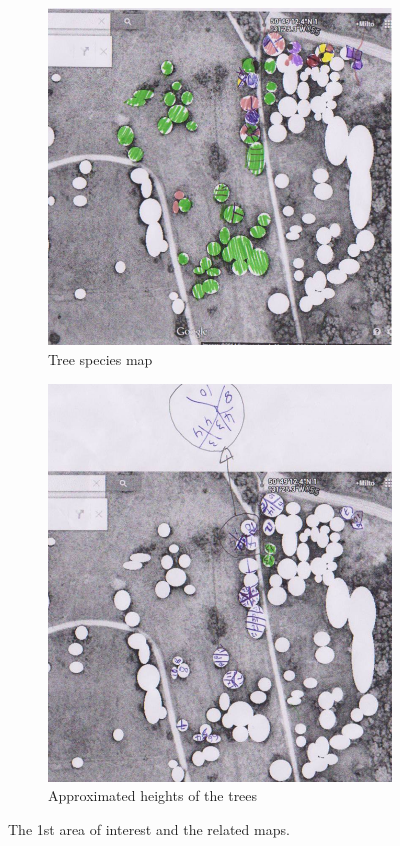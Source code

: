 \documentclass{subfiles}
\begin{document}
\begin{figure} [h!]
\begin{subfigure}[t]{.5\textwidth}
	   		\centering
	   		\includegraphics[width=.9\textwidth]{img/NewForest/Area1Fieldwork_Species}
	   		\caption{Tree species map}
	   		\label{fig:Area1Fieldwork_Species}
	   	\end{subfigure} \hfill
	   	\begin{subfigure}[t]{.5\textwidth}
	   		\centering
	   		\includegraphics[width=.9\textwidth]{img/NewForest/Area1Fieldwork_Heights}
	   		\caption{Approximated heights of the trees} 
	   		\label{fig:Area1Fieldwork_Heights}
	   	\end{subfigure}
	   	\caption{The 1st area of interest and the related maps.} %
	   	\label{fig:NF_Area1} 
	   \end{figure}
	   
\end{document}
